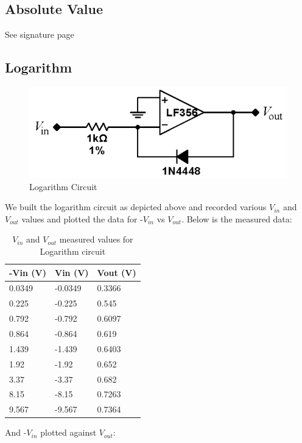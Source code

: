 \documentclass{article}
\begin{document}
    \subsection{Absolute Value}
        See signature page
    \subsection{Logarithm}
    \begin{figure}[H]
        \centering
        \includegraphics[scale = 0.6]{6.png}
        \caption{Logarithm Circuit \cite{lab7}}
        \label{fig:my_label}
    \end{figure}
    We built the logarithm circuit as depicted above and recorded various $V_{in}$ and $V_{out}$ values and plotted the data for -$V_{in}$ vs $V_{out}$. Below is the measured data:
        \begin{table}[H]
            \centering
            \caption{$V_{in}$ and $V_{out}$ measured values for Logarithm circuit}
            \label{my-label}
            \begin{tabular}{lll}
            \textbf{-Vin (V)} & \textbf{Vin (V)} & \textbf{Vout (V)} \\ \hline
            0.0349 & -0.0349 & 0.3366 \\
            0.225 & -0.225 & 0.545 \\
            0.792 & -0.792 & 0.6097 \\
            0.864 & -0.864 & 0.619 \\
            1.439 & -1.439 & 0.6403 \\
            1.92 & -1.92 & 0.652 \\
            3.37 & -3.37 & 0.682 \\
            8.15 & -8.15 & 0.7263 \\
            9.567 & -9.567 & 0.7364
            \end{tabular}
            \end{table}
    And -$V_{in}$ plotted against $V_{out}$:
\end{document}
